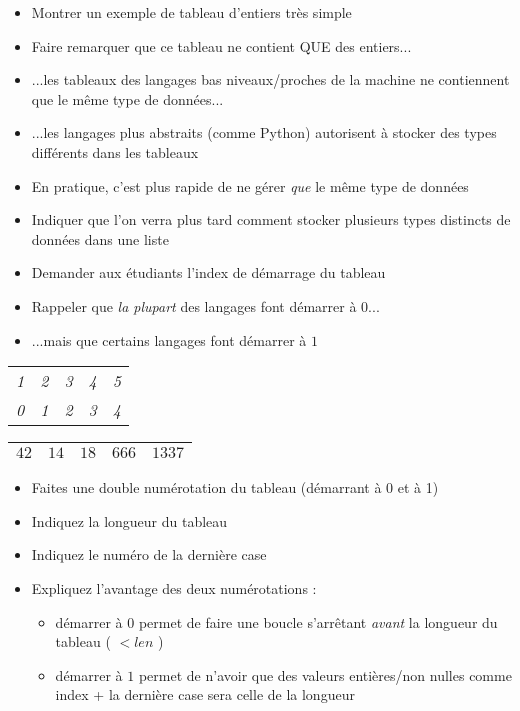 \documentclass[11pt,a4paper]{article}
\begin{document}
\begin{itemize}
\item Montrer un exemple de tableau d'entiers très simple
\item Faire remarquer que ce tableau ne contient QUE des entiers...
\item ...les tableaux des langages bas niveaux/proches de la machine ne contiennent que le même type de données...
\item ...les langages plus abstraits (comme Python) autorisent à stocker des types différents dans les tableaux
\item En pratique, c'est plus rapide de ne gérer \textit{que} le même type de données
\item Indiquer que l'on verra plus tard comment stocker plusieurs types distincts de données dans une liste
\end{itemize}

\medskip

\begin{itemize}
\item Demander aux étudiants l'index de démarrage du tableau
\item Rappeler que \textit{la plupart} des langages font démarrer à $ 0 $...
\item ...mais que certains langages font démarrer à $ 1 $
\end{itemize}

\begin{table}[h!]
  \centering
  \begin{tabular}{ C{0.77cm}  C{0.77cm}  C{0.77cm}  C{0.77cm}  C{0.77cm} }
\textit{1} & \textit{2} & \textit{3} & \textit{4} & \textit{5} \\
\textit{0} & \textit{1} & \textit{2} & \textit{3} & \textit{4} \\
  \end{tabular}

  \begin{tabular}{| C{0.77cm} | C{0.77cm} | C{0.77cm} | C{0.77cm} | C{0.77cm} |}
  \hline
$ 42 $ & $ 14 $ & $ 18 $ & $ 666 $ & $ 1337 $ \\
  \hline
  \end{tabular}
\end{table}


\begin{itemize}
\item Faites une double numérotation du tableau (démarrant à 0 et à 1)
\item Indiquez la longueur du tableau
\item Indiquez le numéro de la dernière case
\item Expliquez l'avantage des deux numérotations :
  \begin{itemize}
  \item démarrer à $ 0 $ permet de faire une boucle s'arrêtant \textit{avant} la longueur du tableau ( $ < len $ )
  \item démarrer à $ 1 $ permet de n'avoir que des valeurs entières/non nulles comme index + la dernière case sera celle de la longueur
  \end{itemize}
\end{itemize}
\end{document}
